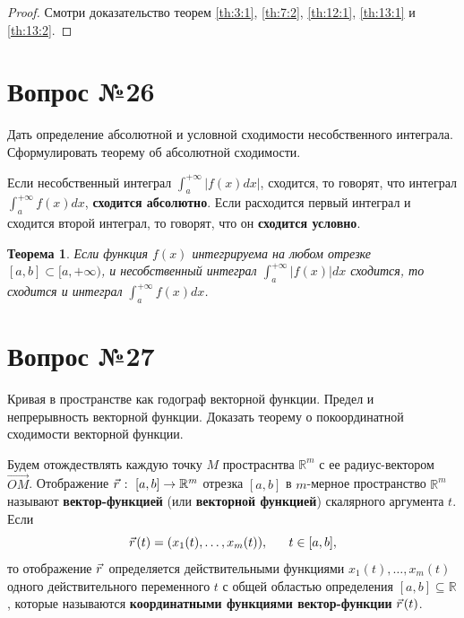 \documentclass[12pt]{report}
\numberwithin{equation}{section}
\newtheorem{theorem}{Теорема}[section]
\newcommand{\pvec}[1]{\vec{#1}\mkern2mu\vphantom{#1}}
\begin{document}
\begin{proof}
Смотри доказательство теорем \ref{th:3:1}, \ref{th:7:2}, \ref{th:12:1}, \ref{th:13:1} и \ref{th:13:2}.
\end{proof}

\newpage \section{Вопрос №26} %
\begin{framed}
Дать определение абсолютной и условной сходимости несобственного интеграла. Сформулировать теорему об абсолютной сходимости.
\end{framed}
Если несобственный интеграл $\int_a^{+\infty}|f(x)dx|$, сходится, то говорят, что интеграл $\int_a^{+\infty}f(x)dx$, \textbf{сходится абсолютно}. Если расходится первый интеграл и сходится второй интеграл, то говорят, что он \textbf{сходится условно}.\\

\begin{theorem} \label{th:26:1}
Если функция $f(x)$ интегрируема на любом отрезке $[a,b] \subset [a, +\infty)$, и несобственный интеграл $\int_a^{+\infty} |f(x)|dx$ сходится, то сходится и интеграл $\int_a^{+\infty}f(x)dx$.
\end{theorem}

\newpage \section{Вопрос №27} %
\begin{framed}
Кривая в пространстве как годограф векторной функции. Предел и непрерывность векторной функции. Доказать теорему о покоординатной сходимости векторной функции.
\end{framed}
Будем отождествлять каждую точку $M$ простраснтва $\mathbb{R}^m$ с ее радиус-вектором $\overrightarrow{OM}$. Отображение $\pvec{r}:~[a,b] \to \mathbb{R}^m$ отрезка $[a,b]$ в $m$-мерное пространство $\mathbb{R}^m$ называют \textbf{вектор-функцией} (или \textbf{векторной функцией}) скалярного аргумента $t$. Если
\begin{equation} \label{eq:27:1}
\pvec{r}(t) = (x_1(t), \ldots, x_m(t)),~~~~~ t \in [a,b],
\end{equation}
то отображение $\pvec{r}$ определяется действительными функциями $x_1(t), \ldots, x_m(t)$ одного действительного переменного $t$ с общей областью определения $[a,b] \subseteq \mathbb{R}$, которые называются \textbf{координатными функциями вектор-функции} $\pvec{r}(t)$.\\
\end{document}
